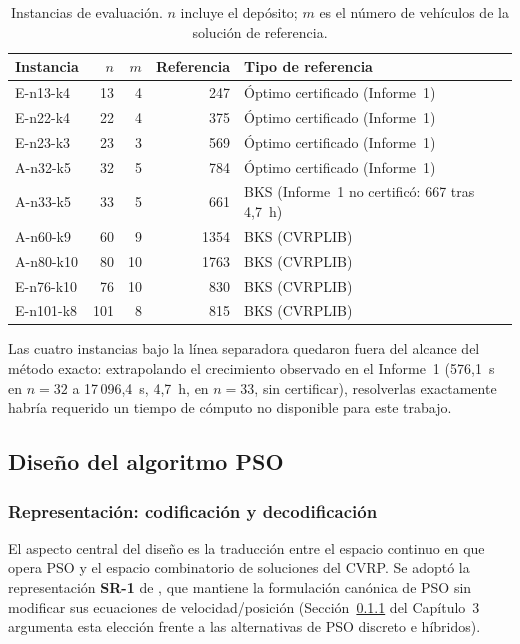 \begin{table}[H]
\centering
\caption{Instancias de evaluación. $n$ incluye el depósito; $m$ es el número de
vehículos de la solución de referencia.}
\label{tab:m2_instancias}
\begin{tabular}{lrrrl}
\hline
Instancia & $n$ & $m$ & Referencia & Tipo de referencia \\
\hline
E-n13-k4  & 13  & 4  & 247  & Óptimo certificado (Informe~1) \\
E-n22-k4  & 22  & 4  & 375  & Óptimo certificado (Informe~1) \\
E-n23-k3  & 23  & 3  & 569  & Óptimo certificado (Informe~1) \\
A-n32-k5  & 32  & 5  & 784  & Óptimo certificado (Informe~1) \\
A-n33-k5  & 33  & 5  & 661  & BKS (Informe~1 no certificó: 667 tras 4{,}7~h) \\
\hline
A-n60-k9   & 60  & 9  & 1354 & BKS (CVRPLIB) \\
A-n80-k10  & 80  & 10 & 1763 & BKS (CVRPLIB) \\
E-n76-k10  & 76  & 10 & 830  & BKS (CVRPLIB) \\
E-n101-k8  & 101 & 8  & 815  & BKS (CVRPLIB) \\
\hline
\end{tabular}
\end{table}

Las cuatro instancias bajo la línea separadora quedaron fuera del alcance del método
exacto: extrapolando el crecimiento observado en el Informe~1 (576{,}1~s en $n=32$ a
17\,096{,}4~s, 4{,}7~h, en $n=33$, sin certificar), resolverlas exactamente habría
requerido un tiempo de cómputo no disponible para este trabajo.

\subsection{Diseño del algoritmo PSO}

\subsubsection{Representación: codificación y decodificación}
\label{sec:representacion}

El aspecto central del diseño es la traducción entre el espacio continuo en que opera
PSO y el espacio combinatorio de soluciones del CVRP. Se adoptó la representación
\textbf{SR-1} de \textcite{ai2009particle}, que mantiene la formulación canónica de PSO
sin modificar sus ecuaciones de velocidad/posición (Sección~\ref{sec:representacion} del
Capítulo~3 argumenta esta elección frente a las alternativas de PSO discreto e híbridos).

